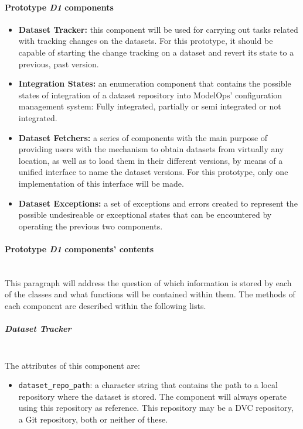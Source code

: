 \paragraph{Prototype \emph{D1} components}

\begin{itemize}
    \item \textbf{Dataset Tracker: }this component will be used for carrying out tasks related with tracking changes on the datasets. For this prototype, it should be 
    capable of starting the change tracking on a dataset and revert its state to a previous, past version.
    
    \item \textbf{Integration States: }an enumeration component that contains the possible states of integration of a dataset repository into ModelOps' configuration management 
    system: Fully integrated, partially or semi integrated or not integrated.
    
    \item \textbf{Dataset Fetchers: }a series of components with the main purpose of providing users with the mechanism to obtain datasets from virtually any location, as well as to 
    load them in their different versions, by means of a unified interface to name the dataset versions. For this prototype, only one implementation of this interface will be made.
    
    \item \textbf{Dataset Exceptions: }a set of exceptions and errors created to represent the possible undesireable or exceptional states that can be encountered by operating 
    the previous two components.

\end{itemize}

\paragraph{Prototype \emph{D1} components' contents}\mbox{}\\

This paragraph will address the question of which information is stored by each of the classes and what functions will be contained within them. The methods of each component 
are described within the following lists.

\subparagraph{Dataset Tracker}\mbox{}\\


The attributes of this component are:

\begin{itemize}
    \item \texttt{dataset\_repo\_path}: a character string that contains the path to a local repository where the dataset is stored. The component 
    will always operate using this repository as reference. This repository may be a DVC repository, a Git repository, both or neither of these.
\end{itemize}

